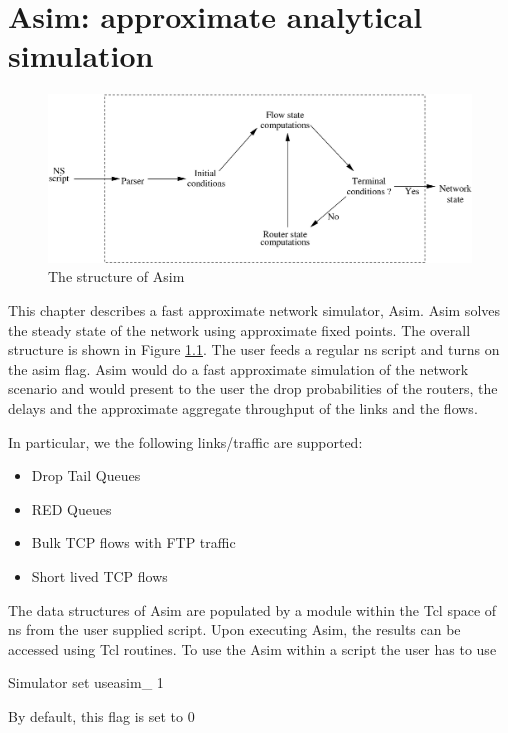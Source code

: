 \chapter{Asim: approximate analytical simulation}
\label{chap:asim}

\begin{figure}
\vspace{1em}
\centerline{\includegraphics[angle=0,width=5in]{figures/struct.eps}}
\vspace{1em}
\caption{The structure of Asim}
\label{fig:struct}
\end{figure}


This chapter describes a fast approximate network simulator, Asim. 
Asim solves the steady state of the network using 
approximate fixed points. The overall structure is shown in 
Figure \ref{fig:struct}.
The user feeds a regular ns script 
and turns on the asim flag.
Asim would do a fast approximate simulation of the 
network scenario and would present to the user the drop probabilities
of the routers, 
the delays and the approximate aggregate throughput 
of the links and the flows.

In particular, we the following links/traffic are supported:
\begin{itemize}
\item Drop Tail Queues
\item RED Queues
\item Bulk TCP flows with FTP traffic
\item Short lived TCP flows 
\end{itemize} 

The data structures of Asim 
are populated by a module within the Tcl space of ns from the 
user supplied script. Upon executing Asim, the results can 
be accessed using Tcl routines. 
To use the Asim within a script the user has to use 

\noindent Simulator set useasim\_ 1

\noindent By default, this flag is set to 0

